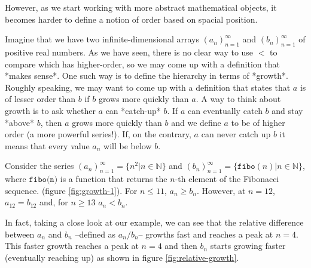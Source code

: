 \documentclass[11pt]{article}
\begin{document}
\begin{figure*}[h!]
	\centering
	
	\caption{Numbers on the real line. In this example, we see that $a < b$ since $a$ is to the left of $b$.}
	\label{fig:real-line}
\end{figure*}

However, as we start working with more abstract mathematical objects, it becomes harder to define a notion of order based on spacial position.

Imagine that we have two infinite-dimensional arrays $(a_n)_{n=1}^\infty$ and $(b_n)_{n=1}^\infty$ of positive real numbers. As we have seen, there is no clear way to use $<$ to compare which has higher-order, so we may come up with a definition that *makes sense*. One such way is to define the hierarchy in terms of *growth*. Roughly speaking, we may want to come up with a definition that states that $a$ is of lesser order than $b$ if $b$ grows more quickly than $a$. A way to think about growth is to ask whether $a$ can *catch-up* $b$. If $a$ can eventually catch $b$ and stay *above* $b$, then $a$ grows more quickly than $b$ and we define $a$ to be of higher order (a more powerful series!). If, on the contrary, $a$ can never catch up $b$ it means that every value $a_n$ will be below $b$.

Consider the series $(a_n)_{n=1}^\infty = \{n^2 \vert n\in\mathbb{N}\}$ and $(b_n)_{n=1}^\infty = \{\texttt{fibo}(n) \vert n\in\mathbb{N}\}$, where $\texttt{fibo(n)}$ is a function that returns the $n$-th element of the Fibonacci sequence. (figure \ref{fig:growth-1}). For $n \leq 11$, $a_n \geq b_n$. However, at $n=12$, $a_{12} = b_{12}$ and, for $n\geq 13$ $a_n < b_n$.

\begin{figure*}[h!]
	\centering
	\scalebox{0.5}{}
	\caption{Plot of two series}
	\label{fig:growth-1}
\end{figure*}

In fact, taking a close look at our example, we can see that the relative difference between $a_n$ and $b_n$ --defined as $a_n / b_n$-- growths fast and reaches a peak at $n=4$. This faster growth reaches a peak at $n=4$ and then $b_n$ starts growing faster (eventually reaching up) as shown in figure \ref{fig:relative-growth}.

\begin{figure*}[h!]
	\centering
	\scalebox{0.5}{}
	\caption{Plot of two series}
	\label{fig:relative-growth}
\end{figure*}
\end{document}
